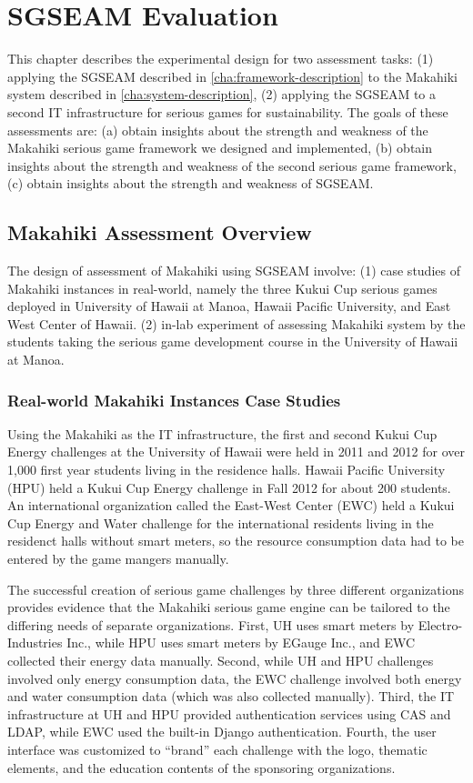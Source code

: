 \chapter{SGSEAM Evaluation}
\label{cha:ExperimentalDesign}

This chapter describes the experimental design for two assessment tasks: (1) applying the SGSEAM described in \autoref{cha:framework-description} to the Makahiki system described in \autoref{cha:system-description}, (2) applying the SGSEAM to a second IT infrastructure for serious games for sustainability. The goals of these assessments are: (a) obtain insights about
 the strength and weakness of the Makahiki serious game framework we designed and implemented,
 (b) obtain insights about
 the strength and weakness of the second serious game framework,
 (c) obtain insights about the strength and weakness of SGSEAM.

\section{Makahiki Assessment Overview}
The design of assessment of Makahiki using SGSEAM involve: (1) case studies of Makahiki instances in real-world, namely the three Kukui Cup serious games deployed in University of Hawaii at Manoa, Hawaii Pacific University, and East West Center of Hawaii. (2) in-lab experiment of assessing Makahiki system by the students taking the serious game development course in the University of Hawaii at Manoa.

\subsection{Real-world Makahiki Instances Case Studies}

Using the Makahiki as the IT infrastructure, the first and second Kukui Cup Energy challenges at the University of Hawaii were held in 2011 and 2012 for over 1,000 first year students living in the residence halls. Hawaii Pacific University (HPU) held a Kukui Cup Energy challenge in Fall 2012 for about 200 students. An international organization called the East-West Center (EWC) held a Kukui Cup Energy and Water challenge for the international residents living in the residenct halls without smart meters, so the resource consumption data had to be entered by the game mangers manually.

The successful creation of serious game challenges by three different organizations provides evidence that the Makahiki serious game engine can be tailored to the differing needs of separate organizations. First, UH uses smart meters by Electro-Industries Inc., while HPU uses smart meters by EGauge Inc., and EWC collected their energy data manually. Second, while UH and HPU challenges involved only energy consumption data, the EWC challenge involved both energy and water consumption data (which was also collected manually).  Third, the IT infrastructure at UH and HPU provided authentication services using CAS and LDAP, while EWC used the built-in Django authentication. Fourth, the user interface was customized to ``brand'' each challenge with the logo, thematic elements, and the education contents of the sponsoring organizations.

